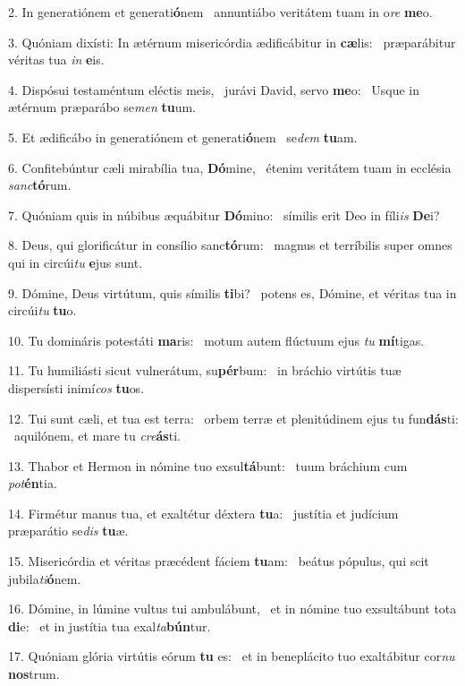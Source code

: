 2. In generatiónem et generati\textbf{ó}nem \ast\  annuntiábo veritátem tuam in o\textit{re} \textbf{me}o.\

3. Quóniam dixísti: In ætérnum misericórdia ædificábitur in \textbf{cæ}lis: \ast\  præparábitur véritas tua \textit{in} \textbf{e}is.\

4. Dispósui testaméntum eléctis meis, \dag\  jurávi David, servo \textbf{me}o: \ast\  Usque in ætérnum præparábo se\textit{men} \textbf{tu}um.\

5. Et ædificábo in generatiónem et generati\textbf{ó}nem \ast\  se\textit{dem} \textbf{tu}am.\

6. Confitebúntur cæli mirabília tua, \textbf{Dó}mine, \ast\  étenim veritátem tuam in ecclésia \textit{sanc}\textbf{tó}rum.\

7. Quóniam quis in núbibus æquábitur \textbf{Dó}mino: \ast\  símilis erit Deo in fíli\textit{is} \textbf{De}i?\

8. Deus, qui glorificátur in consílio sanc\textbf{tó}rum: \ast\  magnus et terríbilis super omnes qui in circúi\textit{tu} \textbf{e}jus sunt.\

9. Dómine, Deus virtútum, quis símilis \textbf{ti}bi? \ast\  potens es, Dómine, et véritas tua in circúi\textit{tu} \textbf{tu}o.\

10. Tu domináris potestáti \textbf{ma}ris: \ast\  motum autem flúctuum ejus \textit{tu} \textbf{mí}tigas.\

11. Tu humiliásti sicut vulnerátum, su\textbf{pér}bum: \ast\  in bráchio virtútis tuæ dispersísti inimí\textit{cos} \textbf{tu}os.\

12. Tui sunt cæli, et tua est terra: \dag\  orbem terræ et plenitúdinem ejus tu fun\textbf{dás}ti: \ast\  aquilónem, et mare tu \textit{cre}\textbf{ás}ti.\

13. Thabor et Hermon in nómine tuo exsul\textbf{tá}bunt: \ast\  tuum bráchium cum \textit{pot}\textbf{én}tia.\

14. Firmétur manus tua, et exaltétur déxtera \textbf{tu}a: \ast\  justítia et judícium præparátio se\textit{dis} \textbf{tu}æ.\

15. Misericórdia et véritas præcédent fáciem \textbf{tu}am: \ast\  beátus pópulus, qui scit jubila\textit{ti}\textbf{ó}nem.\

16. Dómine, in lúmine vultus tui ambulábunt, \dag\  et in nómine tuo exsultábunt tota \textbf{di}e: \ast\  et in justítia tua exal\textit{ta}\textbf{bún}tur.\

17. Quóniam glória virtútis eórum \textbf{tu} es: \ast\  et in beneplácito tuo exaltábitur cor\textit{nu} \textbf{nos}trum.\

